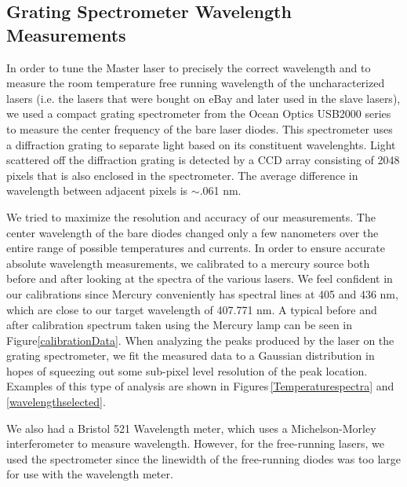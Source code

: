 \subsection{Grating Spectrometer Wavelength Measurements}

In order to tune the Master laser to precisely the correct wavelength and to measure the room temperature free running wavelength of the uncharacterized lasers (i.e. the lasers that were bought on eBay and later used in the slave lasers), we used a compact grating spectrometer from the Ocean Optics USB2000 series to measure the center frequency of the bare laser diodes. This spectrometer uses a diffraction grating to separate light based on its constituent wavelenghts. Light scattered off the diffraction grating is detected by a CCD array consisting of 2048 pixels that is also enclosed in the spectrometer. The average difference in wavelength between adjacent pixels is $\sim$.061 nm. %

We tried to maximize the resolution and accuracy of our measurements. The center wavelength of the bare diodes changed only a few nanometers over the entire range of possible temperatures and currents. In order to ensure accurate absolute wavelength measurements, we calibrated to a mercury source both before and after looking at the spectra of the various lasers. We feel confident in our calibrations since Mercury conveniently has spectral lines at 405 and 436 nm, which are close to our target wavelength of 407.771 nm. A typical before and after calibration spectrum taken using the Mercury lamp can be seen in Figure\ref{calibrationData}. When analyzing the peaks produced by the laser on the grating spectrometer, we fit the measured data to a Gaussian distribution in hopes of squeezing out some sub-pixel level resolution of the peak location. Examples of this type of analysis are shown in Figures\,\ref{Temperaturespectra} and \ref{wavelengthselected}.

We also had a Bristol 521 Wavelength meter, which uses a Michelson-Morley interferometer to measure wavelength. However, for the free-running lasers, we used the spectrometer since the linewidth of the free-running diodes was too large for use with the wavelength meter. 


